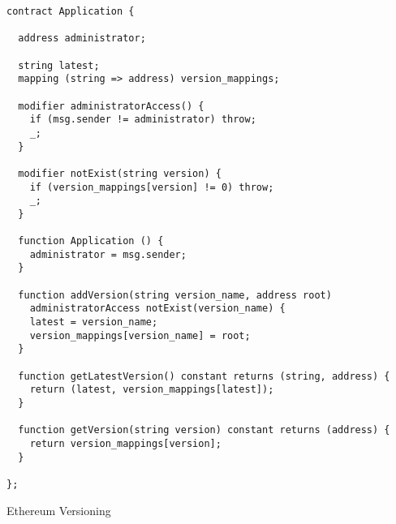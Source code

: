 \begin{listing}[H]
  \centering
  \begin{verbatim}
contract Application {

  address administrator;

  string latest;
  mapping (string => address) version_mappings;

  modifier administratorAccess() {
    if (msg.sender != administrator) throw;
    _;
  }

  modifier notExist(string version) {
    if (version_mappings[version] != 0) throw;
    _;
  }

  function Application () {
    administrator = msg.sender;
  }

  function addVersion(string version_name, address root)
    administratorAccess notExist(version_name) {
    latest = version_name;
    version_mappings[version_name] = root;
  }

  function getLatestVersion() constant returns (string, address) {
    return (latest, version_mappings[latest]);
  }

  function getVersion(string version) constant returns (address) {
    return version_mappings[version];
  }

};
  \end{verbatim}
  \caption{Ethereum Versioning}
  \label{code:ethereum_versioning}
\end{listing}
